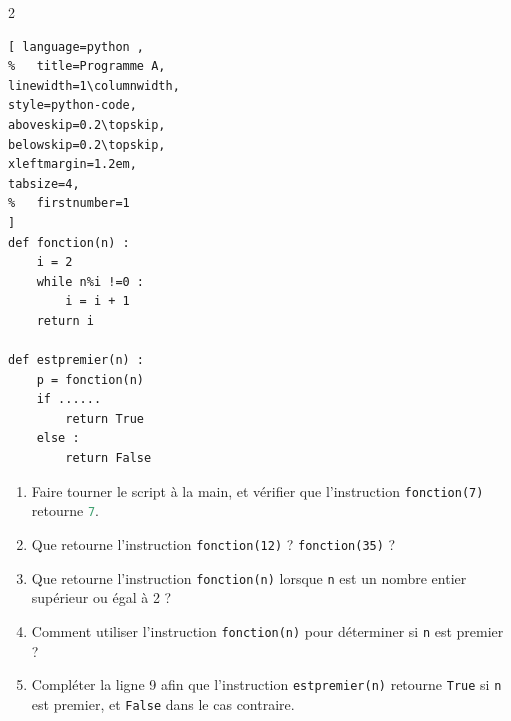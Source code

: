 \begin{exercise}\label{chap03:exo:python:premier02}\hfill  
\begin{multicols}{2} 
\begin{lstlisting}[ language=python , 
%	title=Programme A,   
linewidth=1\columnwidth,
style=python-code,    
aboveskip=0.2\topskip,
belowskip=0.2\topskip,
xleftmargin=1.2em,
tabsize=4,
%	firstnumber=1  
]
def fonction(n) :
	i = 2
	while n%i !=0 :
		i = i + 1
	return i
	
def estpremier(n) :
	p = fonction(n)
	if ......
		return True
	else :
		return False
\end{lstlisting}
\end{multicols} 
	\begin{enumerate}[label={\arabic*)}, leftmargin=*]   
		\item  Faire tourner le script à la main, et vérifier que l'instruction \lstinline|fonction(7)| retourne \lstinline[language=python]|7|.
	\item Que retourne l'instruction \lstinline|fonction(12)| ?  \lstinline|fonction(35)| ? 
	\item Que retourne l'instruction \lstinline|fonction(n)| lorsque \lstinline|n| est un nombre entier supérieur ou égal à 2 ?
	\item Comment utiliser l'instruction \lstinline|fonction(n)| pour déterminer si \lstinline|n| est premier ?
	\item Compléter la ligne 9 afin que l'instruction \lstinline|estpremier(n)| retourne \lstinline|True| si \lstinline|n| est premier, et \lstinline|False| dans le cas contraire.
	\end{enumerate} 
\end{exercise}



